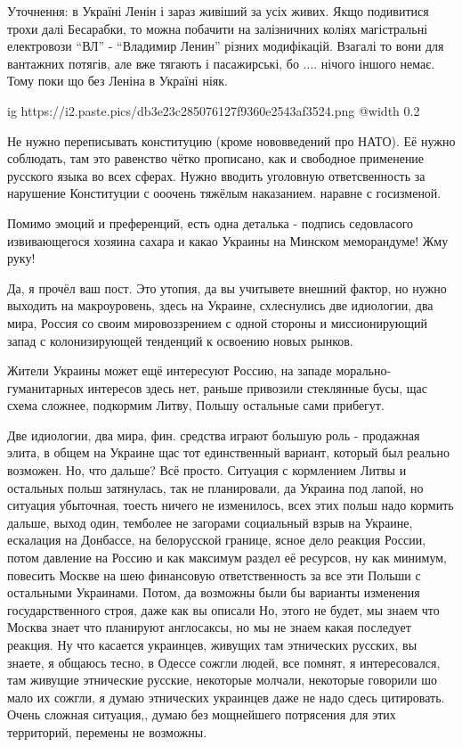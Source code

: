 \begin{itemize}

Уточнення: в Україні Ленін і зараз живіший за усіх живих. Якщо подивитися трохи
далі Бесарабки, то можна побачити на залізничних коліях магістральні
електровози \enquote{ВЛ} - \enquote{Владимир Ленин} різних модифікацій. Взагалі то вони для
вантажних потягів, але вже тягають і пасажирські, бо .... нічого іншого немає.
Тому поки що без Леніна в Україні ніяк.


\ifcmt
  ig https://i2.paste.pics/db3e23c285076127f9360e2543af3524.png
  @width 0.2
\fi


Не нужно переписывать конституцию (кроме нововведений про НАТО). Её нужно
соблюдать, там это равенство чётко прописано, как и свободное применение
русского языка во всех сферах. Нужно вводить уголовную ответсвенность за
нарушение Конституции с ооочень тяжёлым наказанием. наравне с госизменой.


Помимо эмоций и преференций, есть одна деталька - подпись седовласого
извивающегося хозяина сахара и какао Украины на Минском меморандуме! Жму руку!


Да, я прочёл ваш пост. Это утопия, да вы учитывете внешний фактор, но нужно
выходить на макроуровень, здесь на Украине, схлеснулись две идиологии, два
мира, Россия со своим мировоззрением с одной стороны и миссионирующий запад с
колонизирующей тенденций к освоению новых рынков.

Жители Украины может ещё интересуют Россию, на западе морально-гуманитарных
интересов здесь нет, раньше привозили стеклянные бусы, щас схема сложнее,
подкормим Литву, Польшу остальные сами прибегут.

Две идиологии, два мира, фин. средства играют большую роль - продажная элита, в
общем на Украине щас тот единственный вариант, который был реально возможен.
Но, что дальше? Всё просто. Ситуация с кормлением Литвы и остальных польш
затянулась, так не планировали, да Украина под лапой, но ситуация убыточная,
тоесть ничего не изменилось, всех этих польш надо кормить дальше, выход один,
темболее не загорами социальный взрыв на Украине, ескалация на Донбассе, на
белорусской границе, ясное дело реакция России, потом давление на Россию и как
максимум раздел её ресурсов, ну как минимум, повесить Москве на шею финансовую
ответственность за все эти Польши с остальными Украинами. Потом, да возможны
были бы варианты изменения государственного строя, даже как вы описали Но,
этого не будет, мы знаем что Москва знает что планируют англосаксы, но мы не
знаем какая последует реакция. Ну что касается украинцев, живущих там
этнических русских, вы знаете, я общаюсь тесно, в Одессе сожгли людей, все
помнят, я интересовался, там живущие этнические русские, некоторые молчали,
некоторые говорили шо мало их сожгли, я думаю этнических украинцев даже не надо
сдесь цитировать. Очень сложная ситуация,, думаю без мощнейшего потрясения для
этих территорий, перемены не возможны.


\end{itemize}
